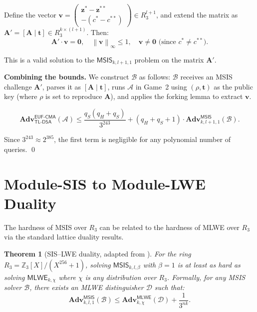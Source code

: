 \documentclass[11pt,a4paper]{article}
\newtheorem{theorem}{Theorem}[section]
\theoremstyle{definition}
\newcommand{\Z}{\mathbb{Z}}
\newcommand{\linf}[1]{\left\lVert #1 \right\rVert_{\infty}}
\newcommand{\Adv}{\mathbf{Adv}}
\newcommand{\MSIS}{\textsf{MSIS}}
\newcommand{\MLWE}{\textsf{MLWE}}
\newcommand{\EUFCMA}{\textsf{EUF-CMA}}
\begin{document}
Define the vector $\mathbf{v} = \begin{pmatrix} \mathbf{z}^* - \mathbf{z}^{**} \\ -(c^* - c^{**}) \end{pmatrix} \in R_3^{l+1}$, and extend the matrix as $\mathbf{A}' = [\mathbf{A} \mid \mathbf{t}] \in R_3^{k \times (l+1)}$. Then:
\[
  \mathbf{A}' \cdot \mathbf{v} = \mathbf{0}, \quad \linf{\mathbf{v}} \leq 1, \quad \mathbf{v} \neq \mathbf{0} \text{ (since } c^* \neq c^{**}\text{)}.
\]

This is a valid solution to the $\MSIS_{k, l+1, 1}$ problem on the matrix $\mathbf{A}'$.

\medskip
\noindent\textbf{Combining the bounds.} We construct $\mathcal{B}$ as follows: $\mathcal{B}$ receives an MSIS challenge $\mathbf{A}'$, parses it as $[\mathbf{A} \mid \mathbf{t}]$, runs $\mathcal{A}$ in Game~2 using $(\rho, \mathbf{t})$ as the public key (where $\rho$ is set to reproduce $\mathbf{A}$), and applies the forking lemma to extract $\mathbf{v}$.

\[
  \Adv^{\EUFCMA}_{\textsf{TL-DSA}}(\mathcal{A})
  \leq \frac{q_S(q_H + q_S)}{3^{243}} + (q_H + q_S + 1) \cdot \Adv^{\MSIS}_{k, l+1, 1}(\mathcal{B}).
\]

Since $3^{243} \approx 2^{385}$, the first term is negligible for any polynomial number of queries. \qed

\section{Module-SIS to Module-LWE Duality}
\label{sec:duality}

The hardness of MSIS over $R_3$ can be related to the hardness of MLWE over $R_3$ via the standard lattice duality results.

\begin{theorem}[SIS--LWE duality, adapted from {\cite[Theorem 4.1]{peikert2016decade}}]
\label{thm:duality}
For the ring $R_3 = \Z_3[X]/(X^{256}+1)$, solving $\MSIS_{k, l, \beta}$ with $\beta = 1$ is at least as hard as solving $\MLWE_{k, \chi}$ where $\chi$ is any distribution over $R_3$. Formally, for any MSIS solver $\mathcal{B}$, there exists an MLWE distinguisher $\mathcal{D}$ such that:
\[
  \Adv^{\MSIS}_{k, l, 1}(\mathcal{B}) \leq \Adv^{\MLWE}_{k, \chi}(\mathcal{D}) + \frac{1}{3^{nk}}.
\]
\end{theorem}
\end{document}
